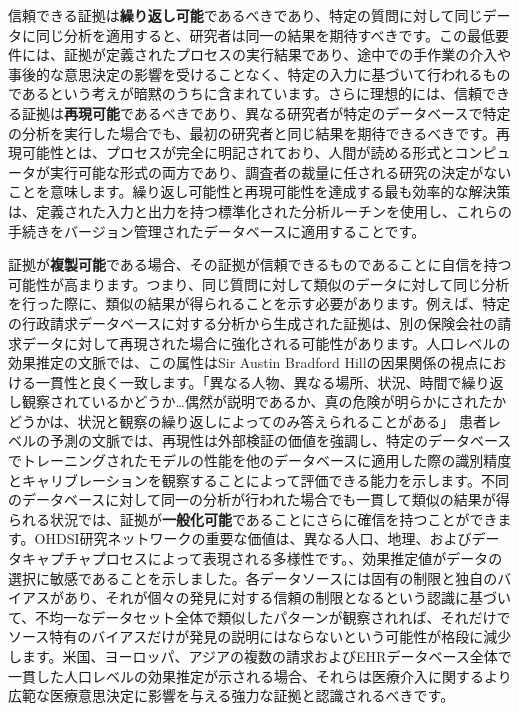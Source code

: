 \documentclass[
  11pt]{book}
\theoremstyle{definition}
\theoremstyle{definition}
\theoremstyle{definition}
\theoremstyle{definition}
\theoremstyle{remark}
\begin{document}
信頼できる証拠は\textbf{繰り返し可能}であるべきであり、特定の質問に対して同じデータに同じ分析を適用すると、研究者は同一の結果を期待すべきです。この最低要件には、証拠が定義されたプロセスの実行結果であり、途中での手作業の介入や事後的な意思決定の影響を受けることなく、特定の入力に基づいて行われるものであるという考えが暗黙のうちに含まれています。さらに理想的には、信頼できる証拠は\textbf{再現可能}であるべきであり、異なる研究者が特定のデータベースで特定の分析を実行した場合でも、最初の研究者と同じ結果を期待できるべきです。再現可能性とは、プロセスが完全に明記されており、人間が読める形式とコンピュータが実行可能な形式の両方であり、調査者の裁量に任される研究の決定がないことを意味します。繰り返し可能性と再現可能性を達成する最も効率的な解決策は、定義された入力と出力を持つ標準化された分析ルーチンを使用し、これらの手続きをバージョン管理されたデータベースに適用することです。

証拠が\textbf{複製可能}である場合、その証拠が信頼できるものであることに自信を持つ可能性が高まります。つまり、同じ質問に対して類似のデータに対して同じ分析を行った際に、類似の結果が得られることを示す必要があります。例えば、特定の行政請求データベースに対する分析から生成された証拠は、別の保険会社の請求データに対して再現された場合に強化される可能性があります。人口レベルの効果推定の文脈では、この属性はSir Austin Bradford Hillの因果関係の視点における一貫性と良く一致します。「異なる人物、異なる場所、状況、時間で繰り返し観察されているかどうか\ldots 偶然が説明であるか、真の危険が明らかにされたかどうかは、状況と観察の繰り返しによってのみ答えられることがある」\citep{hill_1965} 患者レベルの予測の文脈では、再現性は外部検証の価値を強調し、特定のデータベースでトレーニングされたモデルの性能を他のデータベースに適用した際の識別精度とキャリブレーションを観察することによって評価できる能力を示します。不同のデータベースに対して同一の分析が行われた場合でも一貫して類似の結果が得られる状況では、証拠が\textbf{一般化可能}であることにさらに確信を持つことができます。OHDSI研究ネットワークの重要な価値は、異なる人口、地理、およびデータキャプチャプロセスによって表現される多様性です。\citet{madigan_2013は}、効果推定値がデータの選択に敏感であることを示しました。各データソースには固有の制限と独自のバイアスがあり、それが個々の発見に対する信頼の制限となるという認識に基づいて、不均一なデータセット全体で類似したパターンが観察されれば、それだけでソース特有のバイアスだけが発見の説明にはならないという可能性が格段に減少します。米国、ヨーロッパ、アジアの複数の請求およびEHRデータベース全体で一貫した人口レベルの効果推定が示される場合、それらは医療介入に関するより広範な医療意思決定に影響を与える強力な証拠と認識されるべきです。
\end{document}
